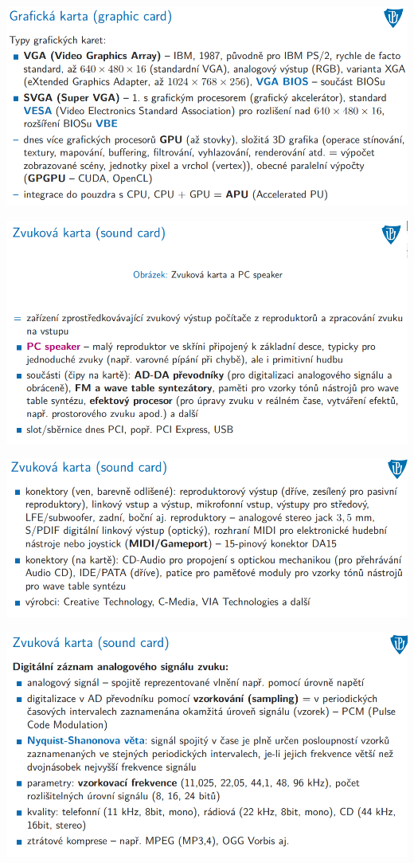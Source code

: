 \documentclass[10pt,a4paper]{article}
\begin{document}
\includegraphics[scale=0.65]{img/prvni_odstavec/otazka7/karty6.png}

\includegraphics[scale=0.65]{img/prvni_odstavec/otazka7/karty7.png}

\includegraphics[scale=0.65]{img/prvni_odstavec/otazka7/karty8.png}

\includegraphics[scale=0.65]{img/prvni_odstavec/otazka7/karty9.png}
\end{document}
